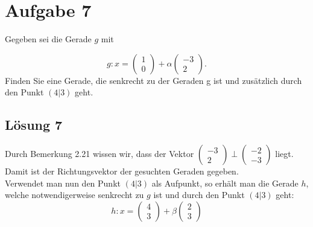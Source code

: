 \section{Aufgabe 7}

Gegeben sei die Gerade $g$ mit

\begin{equation*}
  g:x=\begin{pmatrix}
    1\\
    0
  \end{pmatrix} +\alpha \begin{pmatrix}
    -3\\
    2
  \end{pmatrix} .
\end{equation*}Finden Sie eine Gerade, die senkrecht zu der Geraden g ist und zusätzlich durch den Punkt $\displaystyle ( 4|3)$ geht.

\subsection{Lösung 7}

Durch Bemerkung 2.21 wissen wir, dass der Vektor $\displaystyle \begin{pmatrix}
  -3\\
  2
\end{pmatrix} \perp \begin{pmatrix}
  -2\\
  -3
\end{pmatrix}$ liegt. Damit ist der Richtungsvektor der gesuchten Geraden gegeben.\\

Verwendet man nun den Punkt $\displaystyle (4|3)$ als Aufpunkt, so erhält man die Gerade $h$, welche notwendigerweise senkrecht zu $g$ ist und durch den Punkt $(4|3)$ geht:
\begin{equation*}
  h:x=\begin{pmatrix}
    4\\
    3
  \end{pmatrix} +\beta \begin{pmatrix}
    2\\
    3
  \end{pmatrix}
\end{equation*}